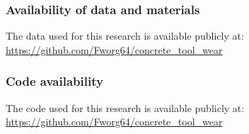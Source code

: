 \subsubsection*{Availability of data and materials}
The data used for this research is available publicly at: \\
\url{https://github.com/Fworg64/concrete_tool_wear}

\subsubsection*{Code availability }
The code used for this research is available publicly at: \\
\url{https://github.com/Fworg64/concrete_tool_wear}
